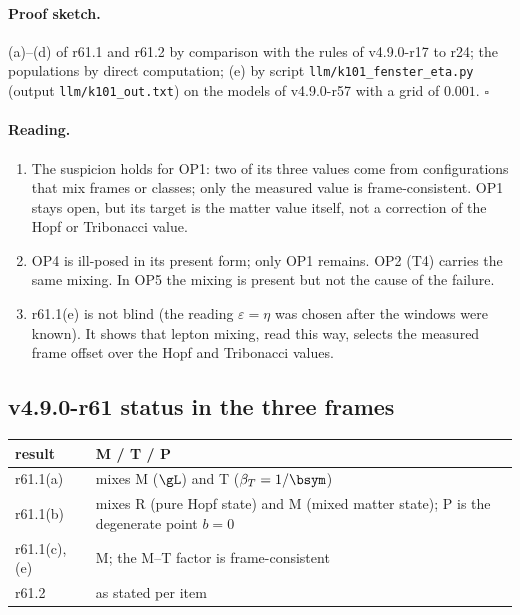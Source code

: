 \paragraph{Proof sketch.}
(a)--(d) of r61.1 and r61.2 by comparison with the rules of v4.9.0-r17 to r24; the populations by direct computation; (e) by script \texttt{llm/k101\_fenster\_eta.py}
(output \texttt{llm/k101\_out.txt}) on the models of v4.9.0-r57 with a grid of \(0.001\).  \(\square\)

\paragraph{Reading.}
\begin{enumerate}[leftmargin=2em]
\item The suspicion holds for OP1: two of its three values come from configurations that mix frames or classes; only the measured value is frame-consistent.  OP1 stays
open, but its target is the matter value itself, not a correction of the Hopf or Tribonacci value.
\item OP4 is ill-posed in its present form; only OP1 remains.  OP2 (T4) carries the same mixing.  In OP5 the mixing is present but not the cause of the failure.
\item r61.1(e) is not blind (the reading \(\varepsilon=\eta\) was chosen after the windows were known).  It shows that lepton mixing, read this way, selects the measured
frame offset over the Hopf and Tribonacci values.
\end{enumerate}

\subsection*{v4.9.0-r61 status in the three frames}
\label{subsec:v490-r61-frames}

\begin{center}
\small
\begin{tabular}{@{}>{\raggedright\arraybackslash}p{}>{\raggedright\arraybackslash}p{}@{}}
\toprule
result & M / T / P\\
\midrule
r61.1(a) & mixes M (\(\gL\)) and T (\(\beta_T=1/\bsym\))\\
r61.1(b) & mixes R (pure Hopf state) and M (mixed matter state); P is the degenerate point \(b=0\)\\
r61.1(c), (e) & M; the M--T factor is frame-consistent\\
r61.2 & as stated per item\\
\bottomrule
\end{tabular}
\end{center}

